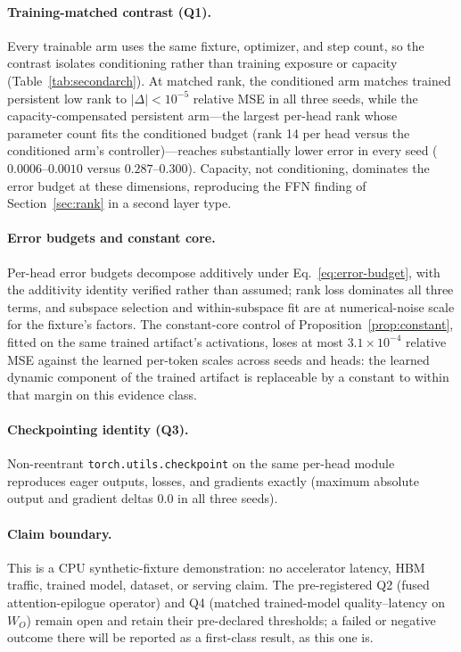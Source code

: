 \paragraph{Training-matched contrast (Q1).}
Every trainable arm uses the same fixture, optimizer, and step count, so the
contrast isolates conditioning rather than training exposure or capacity
(Table~\ref{tab:secondarch}). At matched rank, the conditioned arm matches
trained persistent low rank to $|{\Delta}|<10^{-5}$ relative MSE in all
three seeds, while the capacity-compensated persistent arm---the largest
per-head rank whose parameter count fits the conditioned budget (rank 14
per head versus the conditioned arm's controller)---reaches substantially
lower error in every seed ($0.0006$--$0.0010$ versus $0.287$--$0.300$).
Capacity, not conditioning, dominates the error budget at these dimensions,
reproducing the FFN finding of Section~\ref{sec:rank} in a second layer
type.

\paragraph{Error budgets and constant core.}
Per-head error budgets decompose additively under
Eq.~\eqref{eq:error-budget}, with the additivity identity verified rather
than assumed; rank loss dominates all three terms, and subspace selection
and within-subspace fit are at numerical-noise scale for the fixture's
factors. The constant-core control of Proposition~\ref{prop:constant},
fitted on the same trained artifact's activations, loses at most
$3.1\times10^{-4}$ relative MSE against the learned per-token scales across
seeds and heads: the learned dynamic component of the trained artifact is
replaceable by a constant to within that margin on this evidence class.

\paragraph{Checkpointing identity (Q3).}
Non-reentrant \texttt{torch.utils.checkpoint} on the same per-head module
reproduces eager outputs, losses, and gradients exactly (maximum absolute
output and gradient deltas $0.0$ in all three seeds).

\paragraph{Claim boundary.}
This is a CPU synthetic-fixture demonstration: no accelerator latency, HBM
traffic, trained model, dataset, or serving claim. The pre-registered Q2
(fused attention-epilogue operator) and Q4 (matched trained-model
quality--latency on $W_O$) remain open and retain their pre-declared
thresholds; a failed or negative outcome there will be reported as a
first-class result, as this one is.


